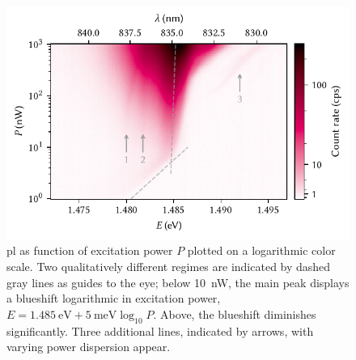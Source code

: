 \begin{figure}
    \centering
    \includegraphics{img/pdf/experiment/doped_M1_05_49-2_power}
    \caption[
        ,
        ,
        .
        \protect\newline
    ]{
        \Gls{pl} as function of excitation power $P$ plotted on a logarithmic color scale.
        Two qualitatively different regimes are indicated by dashed gray lines as guides to the eye; below \qty{10}{\nano\watt}, the main peak displays a blueshift logarithmic in excitation power, $E = \qty{1.485}{\electronvolt} + \qty{5}{\milli\electronvolt}\log_{10} P$.
        Above, the blueshift diminishes significantly.
        Three additional lines, indicated by arrows, with varying power dispersion appear.
    }
    \label{fig:}
\end{figure}

